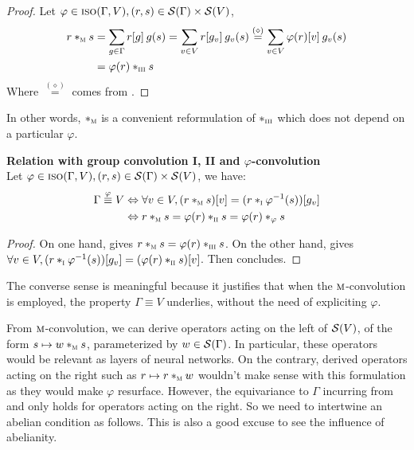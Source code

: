 \begin{proof}
Let $\varphi \in \iso(\Gamma, V),(r,s) \in \cs(\Gamma) \times \cs(V)$,
\begin{align*}
r \ast_{\M} s & = \displaystyle \sum_{g \in \Gamma} r[g] \h{2} g(s)
  = \displaystyle \sum_{v \in V} r[g_v] \h{2} g_v(s)
  \overset{(\diamond)}{=} \displaystyle \sum_{v \in V} \varphi(r)[v] \h{2} g_v(s)\\
& =\varphi(r) \ast_{\III} s
\end{align*}
Where $\overset{(\diamond)}{=}$ comes from .
\end{proof}

In other words, $\ast_{\M}$ is a convenient reformulation of $\ast_{\III}$ which does not depend on a particular $\varphi$.

\begin{lemma}\textbf{Relation with group convolution I, II and $\varphi$-convolution}\\
Let $\varphi \in \iso(\Gamma, V),(r,s) \in \cs(\Gamma) \times \cs(V)$, we have:
\begin{align*}
\Gamma \overset{\varphi}{\equiv} V & \Leftrightarrow \forall v \in V, (r \ast_{\M} s)[v] = (r \ast_{\I} \varphi^{-1}(s))[g_v]\\
& \Leftrightarrow r \ast_{\M} s = \varphi(r) \ast_{\II} s = \varphi(r) \ast_{\varphi} s
\end{align*}
\label{lem:rel12m}
\end{lemma}

\begin{proof}
On one hand,  gives $r \ast_{\M} s = \varphi(r) \ast_{\III} s$. On the other hand,  gives $\forall v \in V,
(r \ast_{\I} \varphi^{-1}(s))[g_v] = (\varphi(r) \ast_{\II} s)[v]$. Then  concludes.
\end{proof}

\begin{remark}
The converse sense is meaningful because it justifies that when the $\M$-convolution is employed, the property $\Gamma \equiv V$ underlies, without the need of expliciting $\varphi$.
\end{remark}

From $\M$-convolution, we can derive operators acting on the left of $\cs(V)$, of the form $s \mapsto w \ast_{\M} s$, parameterized by $w \in \cs(\Gamma)$. In particular, these operators would be relevant as layers of neural networks. On the contrary, derived operators acting on the right such as $r \mapsto r \ast_{\M} w$ wouldn't make sense with this formulation as they would make $\varphi$ resurface. However, the equivariance to $\Gamma$ incurring from  and  only holds for operators acting on the right. So we need to intertwine an abelian condition as follows. This is also a good excuse to see the influence of abelianity.

